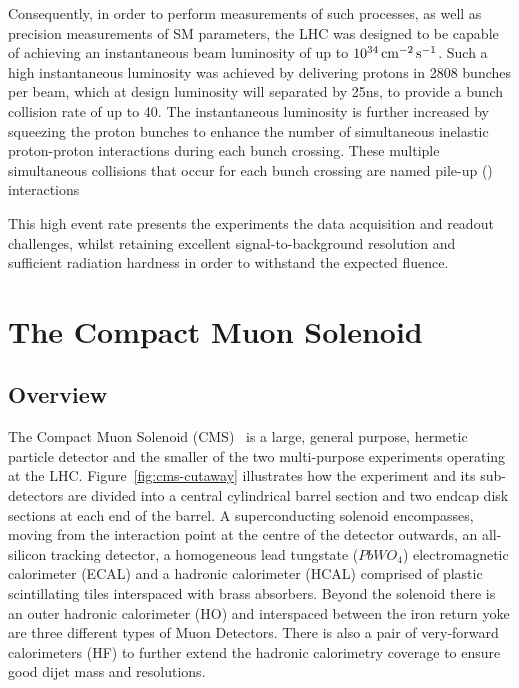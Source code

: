 Consequently, in order to perform measurements of such processes, as well as precision measurements of SM parameters, the LHC was designed to be capable of achieving an instantaneous beam luminosity of up to $10^{34}\,\text{cm}^\text{$-$2}\,\text{s}^\text{$-$1}$.
Such a high instantaneous luminosity was achieved by delivering protons in 2808 bunches per beam, which at design luminosity will separated by 25ns, to provide a bunch collision rate of up to 40\MHz.
The instantaneous luminosity is further increased by squeezing the proton bunches to enhance the number of simultaneous inelastic proton-proton interactions during each bunch crossing.
These multiple simultaneous collisions that occur for each bunch crossing are named pile-up (\PU) interactions~\cite{Bruning:782076,Ball:2007zza}

This high event rate presents the experiments the data acquisition and readout challenges, whilst retaining excellent signal-to-background resolution and sufficient radiation hardness in order to withstand the expected fluence.

\section{The Compact Muon Solenoid}\label{sec:cms}
\subsection{Overview}
The Compact Muon Solenoid (CMS)~\cite{oldcms} is a large, general purpose, hermetic particle detector and the smaller of the two multi-purpose experiments operating at the LHC.
Figure~\ref{fig:cms-cutaway} illustrates how the experiment and its sub-detectors are divided into a central cylindrical barrel section and two endcap disk sections at each end of the barrel.
A superconducting solenoid encompasses, moving from the interaction point at the centre of the detector outwards, an all-silicon tracking detector, a homogeneous lead tungstate ($PbWO_{4}$) electromagnetic calorimeter (ECAL) and a hadronic calorimeter (HCAL) comprised of plastic scintillating tiles interspaced with brass absorbers.
Beyond the solenoid there is an outer hadronic calorimeter (HO) and interspaced between the iron return yoke are three different types of Muon Detectors.
There is also a pair of very-forward calorimeters (HF) to further extend the hadronic calorimetry coverage to ensure good dijet mass and \MET resolutions.

